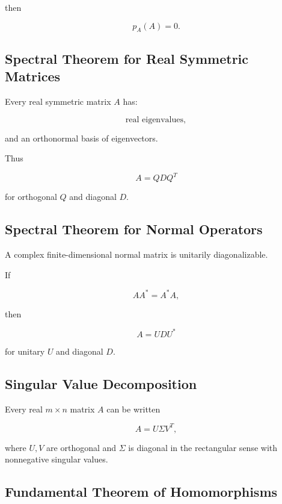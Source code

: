 then

\[
\boxed{
p_A(A)=0.
}
\]

\subsection{Spectral Theorem for Real Symmetric Matrices}
\label{subsec:spectral-theorem-symmetric-summary}

Every real symmetric matrix \(A\) has:

\[
\boxed{
\text{real eigenvalues},
}
\]

and an orthonormal basis of eigenvectors.

Thus

\[
\boxed{
A
=
QDQ^T
}
\]

for orthogonal \(Q\) and diagonal \(D\).

\subsection{Spectral Theorem for Normal Operators}
\label{subsec:spectral-theorem-normal-summary}

A complex finite-dimensional normal matrix is unitarily diagonalizable.

If

\[
AA^*=A^*A,
\]

then

\[
\boxed{
A
=
UDU^*
}
\]

for unitary \(U\) and diagonal \(D\).

\subsection{Singular Value Decomposition}
\label{subsec:svd-theorem-summary}

Every real \(m\times n\) matrix \(A\) can be written

\[
\boxed{
A
=
U\Sigma V^T,
}
\]

where \(U,V\) are orthogonal and \(\Sigma\) is diagonal in the rectangular
sense with nonnegative singular values.

\subsection{Fundamental Theorem of Homomorphisms}
\label{subsec:first-isomorphism-summary}

